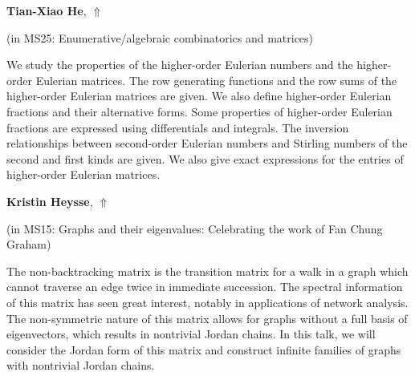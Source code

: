 \documentclass[ILAS2025-program.tex]{subfiles}
\begin{document}
\hypertarget{down0183}{}\begin{ilasabstract}
    
\textbf{Tian-Xiao He},  \hfill \hyperlink{up0183}{$\Uparrow$}
    
    
(in {\color{mstitle}MS25: Enumerative/algebraic combinatorics and matrices})
        
\mtskip
    We study the properties of the higher-order Eulerian numbers and the higher-order Eulerian matrices. The row generating functions and the row sums of the higher-order Eulerian matrices are given. We also define higher-order Eulerian fractions and their alternative forms. Some properties of higher-order Eulerian fractions are expressed using differentials and integrals. The inversion relationships between second-order Eulerian numbers and Stirling numbers of the second and first kinds are given. We also give exact expressions for the entries of higher-order Eulerian matrices.
\end{ilasabstract}
    

\hypertarget{down0062}{}\begin{ilasabstract}
    
\textbf{Kristin Heysse},  \hfill \hyperlink{up0062}{$\Uparrow$}
    
    
(in {\color{mstitle}MS15: Graphs and their eigenvalues: Celebrating the work of Fan Chung Graham})
        
\mtskip
    The non-backtracking matrix is the transition matrix for a walk in a graph which cannot traverse an edge twice in immediate succession. The spectral information of this matrix has seen great interest, notably in applications of network analysis. The non-symmetric nature of this matrix allows for graphs without a full basis of eigenvectors, which results in nontrivial Jordan chains. In this talk, we will consider the Jordan form of this matrix and construct infinite families of graphs with nontrivial Jordan chains. 

\end{ilasabstract}
    
\end{document}
